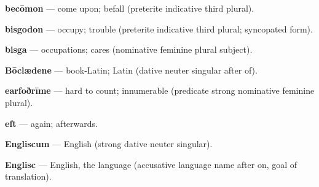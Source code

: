 \textbf{becōmon} — come upon; befall (preterite indicative third plural).

\textbf{bisgodon} — occupy; trouble (preterite indicative third plural; syncopated form).

\textbf{bisga} — occupations; cares (nominative feminine plural subject).

\textbf{Bōclædene} — book-Latin; Latin (dative neuter singular after of).

\textbf{earfoðrīme} — hard to count; innumerable (predicate strong nominative feminine plural).

\textbf{eft} — again; afterwards.

\textbf{Engliscum} — English (strong dative neuter singular).

\textbf{Englisc} — English, the language (accusative language name after on, goal of translation).

